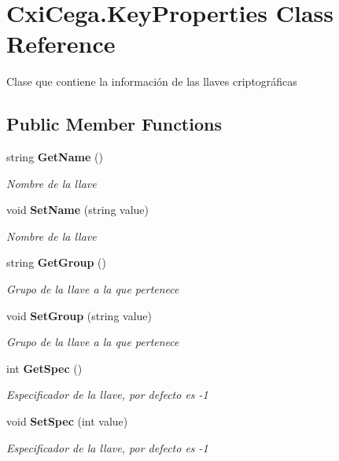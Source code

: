 \section{Cxi\+Cega.\+Key\+Properties Class Reference}
\label{class_cxi_cega_1_1_key_properties}


Clase que contiene la información de las llaves criptográficas  


\subsection*{Public Member Functions}
\begin{DoxyCompactItemize}
\item 
string \textbf{ Get\+Name} ()
\begin{DoxyCompactList}\small\item\em Nombre de la llave \end{DoxyCompactList}\item 
void \textbf{ Set\+Name} (string value)
\begin{DoxyCompactList}\small\item\em Nombre de la llave \end{DoxyCompactList}\item 
string \textbf{ Get\+Group} ()
\begin{DoxyCompactList}\small\item\em Grupo de la llave a la que pertenece \end{DoxyCompactList}\item 
void \textbf{ Set\+Group} (string value)
\begin{DoxyCompactList}\small\item\em Grupo de la llave a la que pertenece \end{DoxyCompactList}\item 
int \textbf{ Get\+Spec} ()
\begin{DoxyCompactList}\small\item\em Especificador de la llave, por defecto es -\/1 \end{DoxyCompactList}\item 
void \textbf{ Set\+Spec} (int value)
\begin{DoxyCompactList}\small\item\em Especificador de la llave, por defecto es -\/1 \end{DoxyCompactList}\item 
\mbox{\label{class_cxi_cega_1_1_key_properties_afe77a3faffdefcf2eacc8c3fc229a4b0}} 

\end{DoxyCompactItemize}
